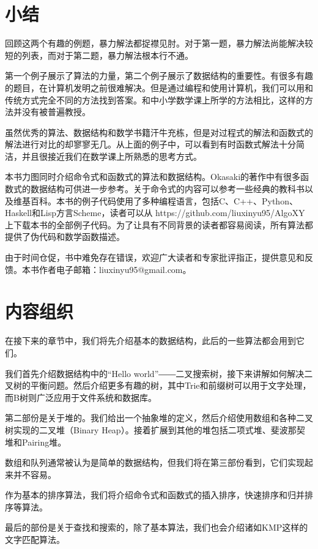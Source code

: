 \documentclass{article}
\begin{document}
\section{小结}
回顾这两个有趣的例题，暴力解法都捉襟见肘。对于第一题，暴力解法尚能解决较短的列表，而对于第二题，暴力解法根本行不通。

第一个例子展示了算法的力量，第二个例子展示了数据结构的重要性。有很多有趣的题目，在计算机发明之前很难解决。但是通过编程和使用计算机，我们可以用和传统方式完全不同的方法找到答案。和中小学数学课上所学的方法相比，这样的方法并没有被普遍教授。

虽然优秀的算法、数据结构和数学书籍汗牛充栋，但是对过程式的解法和函数式的解法进行对比的却寥寥无几。从上面的例子中，可以看到有时函数式解法十分简洁，并且很接近我们在数学课上所熟悉的思考方式。

本书力图同时介绍命令式和函数式的算法和数据结构。Okasaki的著作\cite{okasaki-book}中有很多函数式的数据结构可供进一步参考。关于命令式的内容可以参考一些经典的教科书\cite{CLRS}以及维基百科。本书的例子代码使用了多种编程语言，包括C、C++、Python、Haskell和Lisp方言Scheme，读者可以从 https://github.com/liuxinyu95/AlgoXY 上下载本书的全部例子代码。为了让具有不同背景的读者都容易阅读，所有算法都提供了伪代码和数学函数描述。

由于时间仓促，书中难免存在错误，欢迎广大读者和专家批评指正，提供意见和反馈。本书作者电子邮箱：liuxinyu95@gmail.com。

\section{内容组织}
在接下来的章节中，我们将先介绍基本的数据结构，此后的一些算法都会用到它们。

我们首先介绍数据结构中的“Hello world”――二叉搜索树，接下来讲解如何解决二叉树的平衡问题。然后介绍更多有趣的树，其中Trie和前缀树可以用于文字处理，而B树则广泛应用于文件系统和数据库。

第二部份是关于堆的。我们给出一个抽象堆的定义，然后介绍使用数组和各种二叉树实现的二叉堆（Binary Heap）。接着扩展到其他的堆包括二项式堆、斐波那契堆和Pairing堆。

数组和队列通常被认为是简单的数据结构，但我们将在第三部份看到，它们实现起来并不容易。

作为基本的排序算法，我们将介绍命令式和函数式的插入排序，快速排序和归并排序等算法。

最后的部份是关于查找和搜索的，除了基本算法，我们也会介绍诸如KMP这样的文字匹配算法。
\end{document}
